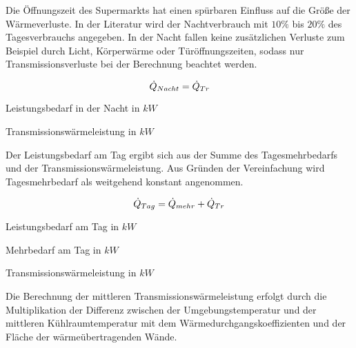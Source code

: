 
Die Öffnungszeit des Supermarkts hat einen spürbaren Einfluss auf die Größe der
Wärmeverluste. In der Literatur wird der Nachtverbrauch mit $10\%$ bis $20\%$
des Tagesverbrauchs angegeben\cite{kauffeld}.  In der Nacht fallen keine
zusätzlichen Verluste zum Beispiel durch Licht, Körperwärme oder
Türöffnungszeiten, sodass nur Transmissionsverluste bei der Berechnung beachtet
werden.

\begin{equation}
	\dot{Q}_{Nacht}=\ptrans
\label{pnacht}
\end{equation}

\begin{description}[\dth]

	\item[$\pnacht$] Leistungsbedarf in der Nacht in $kW$
	\item[$\ptrans$] Transmissionswärmeleistung in $kW$

\end{description}
\vspace{0.5cm}


Der Leistungsbedarf am Tag ergibt sich aus der Summe des Tagesmehrbedarfs und
der Transmissionswärmeleistung. Aus Gründen der Vereinfachung wird
Tagesmehrbedarf als weitgehend konstant angenommen.

\begin{equation}
	\ptag = \pmehr + \ptrans
\label{ptag}
\end{equation}

\begin{description}[\dth]

	\item[$\ptag$] Leistungsbedarf am Tag in $kW$
	\item[$\pmehr$] Mehrbedarf am Tag in $kW$
	\item[$\ptrans$] Transmissionswärmeleistung in $kW$

\end{description}
\vspace{0.5cm}

Die Berechnung der mittleren Transmissionswärmeleistung erfolgt durch die
Multiplikation der Differenz zwischen der Umgebungstemperatur und der mittleren
Kühlraumtemperatur mit dem Wärmedurchgangskoeffizienten und der Fläche der
wärmeübertragenden Wände.

